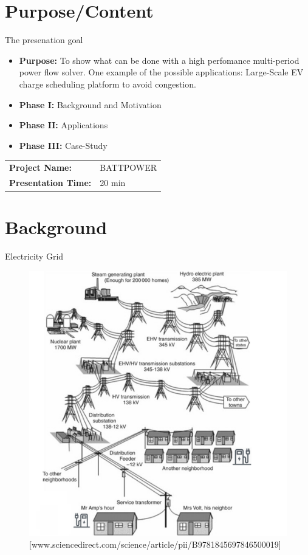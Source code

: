 \documentclass{beamer}
\begin{document}
\begin{frame}
\titlepage
\end{frame}
\section{Purpose/Content}
\begin{frame}{The presenation goal}
\begin{itemize}
\item \textbf{Purpose:} To show what can be done with a high perfomance multi-period power flow solver. One example of the possible applications: Large-Scale EV charge scheduling platform to avoid congestion. 
\item \textbf{Phase I:} Background and Motivation
\item \textbf{Phase II:} Applications
\item \textbf{Phase III:} Case-Study
\end{itemize}
\begin{center}
\begin{tabular}{|l l|} 
\hline
\rowcolor{Gray} \textbf{Project Name:} &BATTPOWER \\
\textbf{Presentation Time:}& 20 min \\
\hline
\end{tabular}
\end{center}
\end{frame}

\section{Background}
\begin{frame}{Electricity Grid}
\begin{figure}[!htbp]
\centering
\includegraphics[width=2.8 in , height=2.4 in]{Figures/EVchalendge1.png}
\caption{\tiny[www.sciencedirect.com/science/article/pii/B9781845697846500019]}
\end{figure}
\end{frame}
\end{document}
